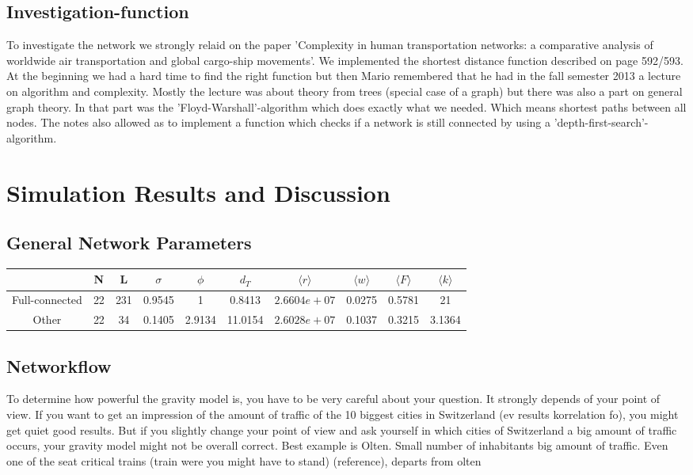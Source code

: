 \documentclass[11pt]{article}
\begin{document}
\subsection{Investigation-function}
To investigate the network we strongly relaid on the paper 'Complexity in human transportation networks: a comparative analysis of worldwide air transportation and global cargo-ship movements'.
We implemented the shortest distance function described on page 592/593. At the beginning we had a hard time to find the right function but then Mario remembered that he had in the fall semester 2013 a lecture on algorithm and complexity. Mostly the lecture was about theory from trees (special case of a graph) but there was also a part on general graph theory. In that part was the 'Floyd-Warshall'-algorithm which does exactly what we needed. Which means shortest paths between all nodes.
The notes also allowed as to implement a function which checks if a network is still connected by using a 'depth-first-search'-algorithm.




\section{Simulation Results and Discussion}

\subsection{General Network Parameters}
\begin{tabular}{c|c|c|c|c|c|c|c|c|c|}
 & N & L & $\sigma$ & $\phi$ & $d_T$ & $\langle r\rangle$ & 
 $\langle w\rangle$ & $\langle F\rangle$&$\langle k\rangle$ \\\hline
 Full-connected & 22 & 231 &0.9545&1& 0.8413& $2.6604e+07$&0.0275&0.5781& 21\\\hline
 
 Other & 22 & 34 &    0.1405&2.9134& 11.0154&$2.6028e+07$&0.1037&0.3215& 3.1364\\\hline
\end{tabular}


\subsection{Networkflow}

To determine how powerful the gravity model is, you have to be very careful about your question. It strongly depends of your point of view. If you want to get an impression of the amount of traffic of the 10 biggest cities in Switzerland (ev results korrelation fo), you might get quiet good results. But if you slightly change your point of view and ask yourself in which cities of Switzerland a big amount of traffic occurs, your gravity model might not be overall correct. Best example is Olten. Small number of inhabitants big amount of traffic. Even one of the seat critical trains (train were you might have to stand) (reference), departs from olten
\end{document}
